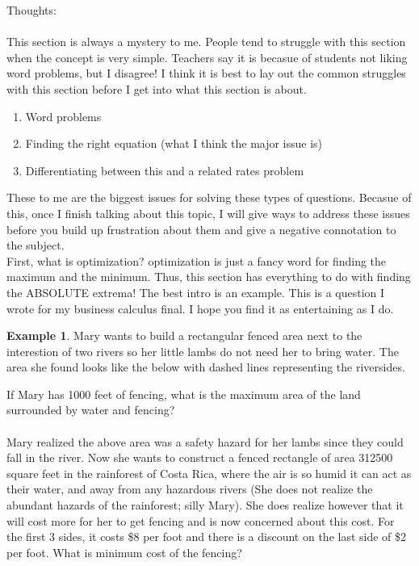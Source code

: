 \documentclass[10pt]{article}
\theoremstyle{Theorem}
\theoremstyle{definition}
\newtheorem{ex}{Example}[section]
\theoremstyle{remark}
\theoremstyle{custom}
\begin{document}
\thispagestyle{firststyle}
\pagestyle{plain}

Thoughts:\\\\
This section is always a mystery to me. People tend to struggle with this section when the concept is very simple. Teachers say it is becasue of students not liking word problems, but I disagree! I think it is best to lay out the common struggles with this section before I get into what this section is about.
\begin{enumerate}[1.]
\item Word problems
\item Finding the right equation (what I think the major issue is)
\item Differentiating between this and a related rates problem
\end{enumerate}
These to me are the biggest issues for solving these types of questions. Becasue of this, once I finish talking about this topic, I will give ways to address these issues before you build up frustration about them and give a negative connotation to the subject.\\
First, what is optimization? optimization is just a fancy word for finding the maximum and the minimum. Thus, this section has everything to do with finding the ABSOLUTE extrema! The best intro is an example. This is a question I wrote for my business calculus final. I hope you find it as entertaining as I do.\\
\begin{ex}
Mary wants to build a rectangular fenced area next to the interestion of two rivers so her little lambs do not need her to bring water. The area she found looks like the below with dashed lines representing the riversides. 
	\begin{center}
	\end{center}	
	If Mary has 1000 feet of fencing, what is the maximum area of the land surrounded by water and fencing?\\\\
	
Mary realized the above area was a safety hazard for her lambs since they could fall in the river. Now she wants to construct a fenced rectangle of area 312500 square feet in the rainforest of Costa Rica, where the air is so humid it can act as their water, and away from any hazardous rivers (She does not realize the abundant hazards of the rainforest; silly Mary).  She does realize however that it will cost more for her to get fencing and is now concerned about this cost. For the first 3 sides, it costs \$8 per foot and there is a discount on the last side of \$2 per foot.  What is minimum cost of the fencing?
\end{ex}
\end{document}
